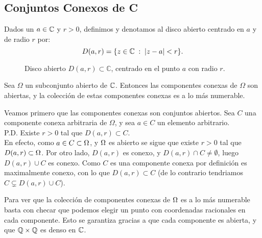 
\subsection{Conjuntos Conexos de C}

Dados un $a\in \mathbb{C}$  y $r>0$, definimos y denotamos al disco abierto centrado en $a$ y de radio $r$ por:
\[ D(a,r) = \{ z\in \mathbb{C}\; : \; |z - a| < r \}. \]

\begin{figure}[H]
    \centering
    \caption{Disco abierto \( D(a, r) \subset \mathbb{C} \), centrado en el punto \( a \) con radio \( r \).}
    \label{fig:disco_abierto}
\end{figure}
    
\begin{theo}
    Sea $\Omega$ un subconjunto abierto de $\mathbb{C}$. Entonces las componentes conexas de $\Omega$ son abiertas, y la
    colección de estas componentes conexas es a lo más numerable.
\end{theo}
\begin{dem}
    Veamos primero que las componentes conexas son conjuntos abiertos. 
    Sea $C$ una componente conexa arbitraria de $\Omega$, y sea $a \in C$ un elemento arbitrario. \\
    P.D. Existe $r>0$ tal que $D(a, r) \subset C$.\\
    En efecto, como $a \in C \subset \Omega$, y $\Omega$ es abierto se sigue que existe $r>0$ tal que $D(a,r) \subset \Omega$.
    Por otro lado, $D(a,r)$ es conexo, y $D(a,r)\cap C \neq \emptyset$, luego $D(a,r)\cup C$ es conexo. Como $C$ es 
    una componente conexa por definición es maximalmente conexo, con lo que $D(a,r) \subset C$ (de lo contrario 
    tendriamos $C \subsetneq D(a,r)\cup C$).

    Para ver que la colección de componentes conexas de $\Omega$ es a lo más numerable basta con checar que podemos elegir
    un punto con coordenadas racionales en cada componente. Esto se garantiza gracias a que cada componente es abierta, 
    y que $\mathbb{Q}\times \mathbb{Q}$ es denso en $\mathbb{C}$.
\end{dem}

